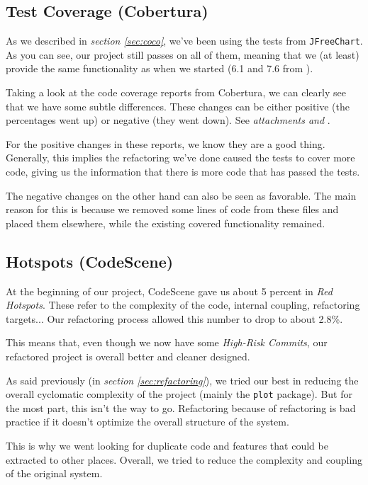 \documentclass[11pt]{article}
\begin{document}
	\subsection{Test Coverage (Cobertura)}
	As we described in \textsl{section \ref{sec:coco}}, we've been using the tests from \texttt{JFreeChart}. As you can see, our project still passes on all of them, meaning that we (at least) provide the same functionality as when we started (6.1 and 7.6 from \cite{demeyer2009object}).
	
	Taking a look at the code coverage reports from \textsf{Cobertura}, we can clearly see that we have some subtle differences. These changes can be either positive (the percentages went up) or negative (they went down). See \textsl{attachments \pageref{refactoring-package-plot} and \pageref{cobertura-begin}}.
	
	For the positive changes in these reports, we know they are a good thing. Generally, this implies the refactoring we've done caused the tests to cover more code, giving us the information that there is more code that has passed the tests.
	
	The negative changes on the other hand can also be seen as favorable. The main reason for this is because we removed some lines of code from these files and placed them elsewhere, while the existing covered functionality remained.
	
	\subsection{Hotspots (CodeScene)}
	At the beginning of our project, \textsf{CodeScene} gave us about 5 percent in \textsl{Red Hotspots}. These refer to the complexity of the code, internal coupling, refactoring targets... Our refactoring process allowed this number to drop to about 2.8\%.
	
	This means that, even though we now have some \textsl{High-Risk Commits}, our refactored project is overall better and cleaner designed.
	
	As said previously (in \textsl{section \ref{sec:refactoring}}), we tried our best in reducing the overall cyclomatic complexity of the project (mainly the \texttt{plot} package). But for the most part, this isn't the way to go. Refactoring because of refactoring is bad practice if it doesn't optimize the overall structure of the system.
	
	This is why we went looking for duplicate code and features that could be extracted to other places. Overall, we tried to reduce the complexity and coupling of the original system.
	
\end{document}
